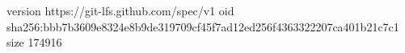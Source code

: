 version https://git-lfs.github.com/spec/v1
oid sha256:bbb7b3609e8324e8b9de319709cf45f7ad12ed256f4363322207ca401b21c7c1
size 174916
